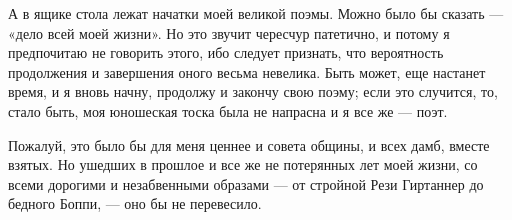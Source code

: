 А  в ящике  стола  лежат начатки  моей великой  поэмы.  Можно было  бы
сказать --- «дело всей моей  жизни». Но это звучит чересчур патетично,
и потому  я предпочитаю не  говорить этого, ибо следует  признать, что
вероятность  продолжения  и  завершения оного  весьма  невелика.  Быть
может, еще  настанет время, и я  вновь начну, продолжу и  закончу свою
поэму; если это случится, то, стало  быть, моя юношеская тоска была не
напрасна и я все же --- поэт.

Пожалуй, это  было бы для  меня ценнее и  совета общины, и  всех дамб,
вместе взятых.  Но ушедших в прошлое  и все же не  потерянных лет моей
жизни, со всеми дорогими и  незабвенными образами --- от стройной Рези
Гиртаннер до бедного Боппи, --- оно бы не перевесило.
